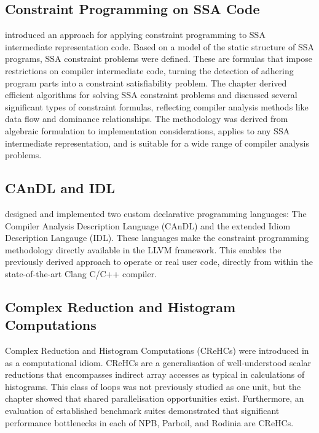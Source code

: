 \subsection*{Constraint Programming on SSA Code}

     introduced an approach for applying constraint
    programming to SSA intermediate representation code.
    Based on a model of the static structure of SSA programs, SSA constraint
    problems were defined.
    These are formulas that impose restrictions on compiler intermediate code,
    turning the detection of adhering program parts into a constraint
    satisfiability problem.
    The chapter derived efficient algorithms for solving SSA constraint problems
    and discussed several significant types of constraint formulas, reflecting
    compiler analysis methods like data flow and dominance relationships.
    The methodology was derived from algebraic formulation to implementation
    considerations, applies to any SSA intermediate representation,
    and is suitable for a wide range of compiler analysis problems.

\subsection*{CAnDL and IDL}

     designed and implemented two
    custom declarative programming languages: The Compiler Analysis
    Description Language (CAnDL) and the extended Idiom Description Langauge
    (IDL).
    These languages make the constraint programming methodology directly
    available in the LLVM framework.
    This enables the previously derived approach to operate or real user code,
    directly from within the state-of-the-art Clang C/C++ compiler.

\subsection*{Complex Reduction and Histogram Computations}

    Complex Reduction and Histogram Computations (CReHCs) were introduced in
     as a computational idiom.
    CReHCs are a generalisation of well-understood scalar reductions that
    encompasses indirect array accesses as typical in calculations of
    histograms.
    This class of loops was not previously studied as one unit, but the
    chapter showed that shared parallelisation opportunities exist.
    Furthermore, an evaluation of established benchmark suites demonstrated
    that significant performance bottlenecks in each of NPB, Parboil, and
    Rodinia are CReHCs.

